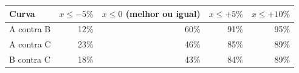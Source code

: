 \begin{tabular}{lrrrr}
\toprule
Curva & $x\le -5\%$ & $x\le 0$ (melhor ou igual) & $x\le +5\%$ & $x\le +10\%$ \\
\midrule
A contra B & 12\% & 60\% & 91\% & 95\% \\
A contra C & 23\% & 46\% & 85\% & 89\% \\
B contra C & 18\% & 43\% & 84\% & 89\% \\
\bottomrule
\end{tabular}
